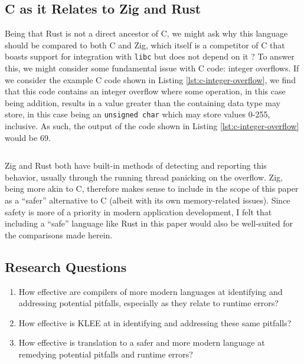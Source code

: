 \documentclass[conference]{IEEEtran}
\newenvironment{code}{\captionsetup{type=listing}}{}
\begin{document}
\subsection{C as it Relates to Zig and Rust}
Being that Rust is not a direct ancestor of C, we might ask why this language
should be compared to both C and Zig, which itself is a competitor of C that
boasts support for integration with \texttt{libc} but does not depend on it
\cite{zig2025overview}? To answer this, we might consider some fundamental issue
with C code: integer overflows. If we consider the example C code shown in
Listing \ref{lst:c-integer-overflow}, we find that this code contains an
integer overflow where some operation, in this case being addition, results in a
value greater than the containing data type may store, in this case being an
\texttt{unsigned char} which may store values 0-255, inclusive. As such, the
output of the code shown in Listing \ref{lst:c-integer-overflow} would be 69.

\begin{code}
    \medskip
    \inputminted{c}{../code-examples/c/integer-overflow.c}
    \label{lst:c-integer-overflow}
    \medskip
\end{code}

Zig and Rust both have built-in methods of detecting and reporting this behavior,
usually through the running thread panicking on the overflow. Zig, being more akin
to C, therefore makes sense to include in the scope of this paper as a ``safer''
alternative to C (albeit with its own memory-related issues). Since safety is more
of a priority in modern application development, I felt that including a ``safe''
language like Rust in this paper would also be well-suited for the comparisons made
herein.

\subsection{Research Questions}
\begin{enumerate}
    \item How effective are compilers of more modern languages at identifying and
        addressing potential pitfalls, especially as they relate to runtime errors?
    \item How effective is KLEE at in identifying and addressing these same
        pitfalls?
    \item How effective is translation to a safer and more modern language at
        remedying potential pitfalls and runtime errors?
\end{enumerate}
\end{document}
